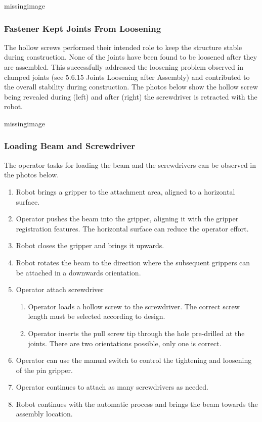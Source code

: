 missingimage

\subsubsection{Fastener Kept Joints From Loosening}
\label{subsubsection:exploration-4-fastener-kept-joints-from-loosening}

The hollow screws performed their intended role to keep the structure stable during construction. None of the joints have been found to be loosened after they are assembled. This successfully addressed the loosening problem observed in clamped joints (see 5.6.15 Joints Loosening after Assembly) and contributed to the overall stability during construction. The photos below show the hollow screw being revealed during (left) and after (right) the screwdriver is retracted with the robot.

missingimage

\subsubsection{Loading Beam and Screwdriver}
\label{subsubsection:exploration-4-loading-beam-and-screwdriver}

The operator tasks for loading the beam and the screwdrivers can be observed in the photos below. 
\begin{enumerate}
    \item Robot brings a gripper to the attachment area, aligned to a horizontal surface.
    \item Operator pushes the beam into the gripper, aligning it with the gripper registration features. The horizontal surface can reduce the operator effort.
    \item Robot closes the gripper and brings it upwards.
    \item Robot rotates the beam to the direction where the subsequent grippers can be attached in a downwards orientation.
    \item Operator attach screwdriver
    \begin{enumerate}
        \item Operator loads a hollow screw to the screwdriver. The correct screw length must be selected according to design.
        \item Operator inserts the pull screw tip through the hole pre-drilled at the joints. There are two orientations possible, only one is correct.
    \end{enumerate}
    \item Operator can use the manual switch to control the tightening and loosening of the pin gripper.
    \item Operator continues to attach as many screwdrivers as needed.
    \item Robot continues with the automatic process and brings the beam towards the assembly location.
\end{enumerate}

